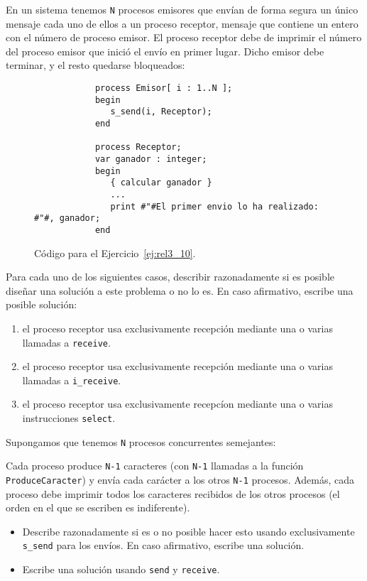 \begin{ejercicio}\label{ej:rel3_10}
    En un sistema tenemos \verb|N| procesos emisores que envían de forma segura un único mensaje cada uno de ellos a un proceso receptor, mensaje que contiene un entero con el número de proceso emisor. El proceso receptor debe de imprimir el número del proceso emisor que inició el envío en primer lugar. Dicho emisor debe terminar, y el resto quedarse bloqueados:
    \begin{figure}[H]
        \centering
        \begin{verbatim}
            process Emisor[ i : 1..N ];
            begin
               s_send(i, Receptor);
            end

            process Receptor;
            var ganador : integer;
            begin
               { calcular ganador }
               ...
               print #"#El primer envio lo ha realizado: #"#, ganador;
            end
        \end{verbatim}
        \caption{Código para el Ejercicio~\ref{ej:rel3_10}.}
        \label{fig:cod_10}
    \end{figure}
    Para cada uno de los siguientes casos, describir razonadamente si es posible diseñar una solución a este problema o no lo es. En caso afirmativo, escribe una posible solución:
    \begin{enumerate}[label=(\alph*)]
        \item el proceso receptor usa exclusivamente recepción mediante una o varias llamadas a \verb|receive|.
        \item el proceso receptor usa exclusivamente recepción mediante una o varias llamadas a \verb|i_receive|.
        \item el proceso receptor usa exclusivamente recepcíon mediante una o varias instrucciones \verb|select|.
    \end{enumerate}
\end{ejercicio}

\begin{ejercicio}\label{ej:rel3_11}
    Supongamos que tenemos \verb|N| procesos concurrentes semejantes:

    Cada proceso produce \verb|N-1| caracteres (con \verb|N-1| llamadas a la función \verb|ProduceCaracter|) y envía cada carácter a los otros \verb|N-1| procesos. Además, cada proceso debe imprimir todos los caracteres recibidos de los otros procesos (el orden en el que se escriben es indiferente).
    \begin{itemize}
        \item Describe razonadamente si es o no posible hacer esto usando exclusivamente \verb|s_send| para los envíos. En caso afirmativo, escribe una solución.
        \item Escribe una solución usando \verb|send| y \verb|receive|.
    \end{itemize}
\end{ejercicio}

